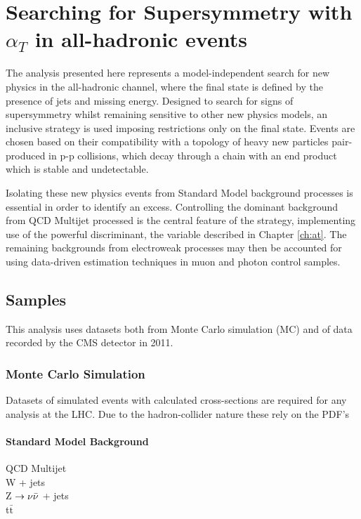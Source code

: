 \chapter{Searching for Supersymmetry with $\alpha_{T}$ in all-hadronic events}
The analysis presented here represents a model-independent search for new physics in the all-hadronic channel, where the final state is defined by the presence of jets and missing energy. Designed to search for signs of supersymmetry whilst remaining sensitive to other new physics models, an inclusive strategy is used imposing restrictions only on the final state.  Events are chosen based on their compatibility with a topology of heavy new particles pair-produced in p-p collisions, which decay through a chain with an end product which is stable and undetectable. 

Isolating these new physics events from Standard Model background processes is essential in order to identify an excess. Controlling the dominant background from QCD Multijet processed is the central feature of the strategy, implementing use of the powerful discriminant, the \alt variable described in Chapter \ref{ch:at}. The remaining backgrounds from electroweak processes may then be accounted for using data-driven estimation techniques in muon and photon control samples. 



\section{Samples}
This analysis uses datasets both from Monte Carlo simulation (MC) and of data recorded by the CMS detector in 2011.

\subsection{Monte Carlo Simulation}
Datasets of simulated events with calculated cross-sections are required for any analysis at the LHC. Due to the hadron-collider nature these rely on the PDF's 
\subsubsection{Standard Model Background}
\begin{description}
\item[QCD Multijet]{}
\item[W + jets]{}
\item[Z $\rightarrow \nu\bar{\nu}$ + jets]{}
\item[t$\bar{\textrm{t}}$]{}
\end{description}
